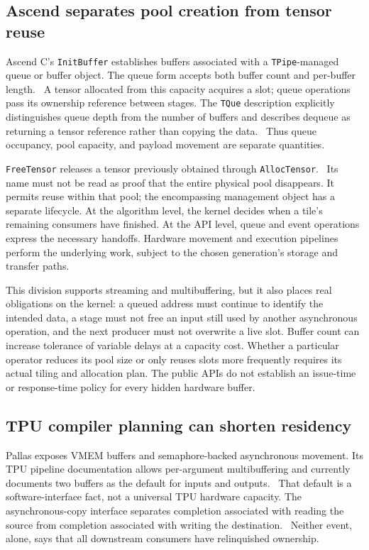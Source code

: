 \subsection{Ascend separates pool creation from tensor reuse}

Ascend C's \texttt{InitBuffer} establishes buffers associated with a \texttt{TPipe}-managed queue or buffer object. The queue form accepts both buffer count and per-buffer length.~\citep{u002-ascend-initbuffer} A tensor allocated from this capacity acquires a slot; queue operations pass its ownership reference between stages. The \texttt{TQue} description explicitly distinguishes queue depth from the number of buffers and describes dequeue as returning a tensor reference rather than copying the data.~\citep{u002-ascend-tque} Thus queue occupancy, pool capacity, and payload movement are separate quantities.

\texttt{FreeTensor} releases a tensor previously obtained through \texttt{AllocTensor}.~\citep{u002-ascend-freetensor} Its name must not be read as proof that the entire physical pool disappears. It permits reuse within that pool; the encompassing management object has a separate lifecycle. At the algorithm level, the kernel decides when a tile's remaining consumers have finished. At the API level, queue and event operations express the necessary handoffs. Hardware movement and execution pipelines perform the underlying work, subject to the chosen generation's storage and transfer paths.

This division supports streaming and multibuffering, but it also places real obligations on the kernel: a queued address must continue to identify the intended data, a stage must not free an input still used by another asynchronous operation, and the next producer must not overwrite a live slot. Buffer count can increase tolerance of variable delays at a capacity cost. Whether a particular operator reduces its pool size or only reuses slots more frequently requires its actual tiling and allocation plan. The public APIs do not establish an issue-time or response-time policy for every hidden hardware buffer.

\subsection{TPU compiler planning can shorten residency}

Pallas exposes VMEM buffers and semaphore-backed asynchronous movement. Its TPU pipeline documentation allows per-argument multibuffering and currently documents two buffers as the default for inputs and outputs.~\citep{u001-pallas-pipeline} That default is a software-interface fact, not a universal TPU hardware capacity. The asynchronous-copy interface separates completion associated with reading the source from completion associated with writing the destination.~\citep{u002-pallas-copy} Neither event, alone, says that all downstream consumers have relinquished ownership.

